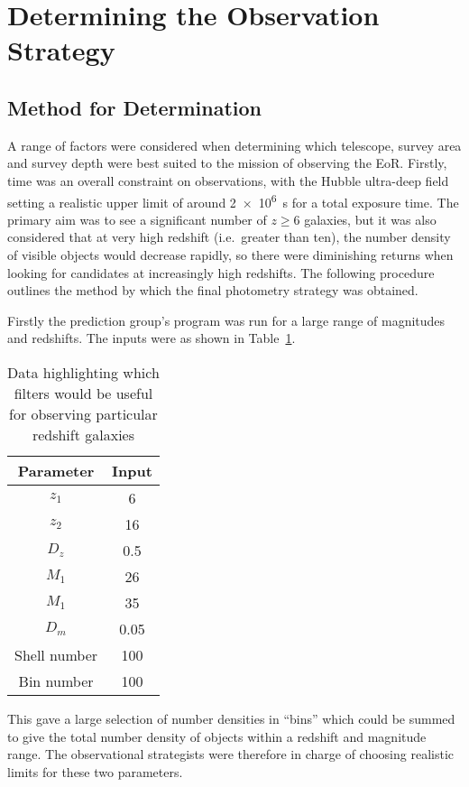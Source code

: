 
\section{Determining the Observation Strategy} %
\label{sec:method_for_strategy_choosing}
	\subsection{Method for Determination} %
	\label{sub:method_for_determination}
		A range of factors were considered when determining which telescope, survey area and survey depth were best suited to the mission of observing the EoR. Firstly, time was an overall constraint on observations, with the Hubble ultra-deep field setting a realistic upper limit of around \SI{2e6}{\second} for a total exposure time. The primary aim was to see a significant number of $z\ge6$ galaxies, but it was also considered that at very high redshift (i.e.\ greater than ten), the number density of visible objects would decrease rapidly, so there were diminishing returns when looking for candidates at increasingly high redshifts. The following procedure outlines the method by which the final photometry strategy was obtained.

		Firstly the prediction group’s program was run for a large range of magnitudes and redshifts. The inputs were as shown in Table~\ref{tab:program_inputs}.
		\begin{table}[!htbp]
			\begin{center}
				\begin{tabular}{c|c}
					Parameter 	& Input \\
					\hline \hline
					$z_1$ & 6 \\
					$z_2$ & 16 \\
					$D_z$ & 0.5 \\
					$M_1$ & 26 \\
					$M_1$ & 35 \\
					$D_m$ & 0.05 \\
					Shell number & 100 \\
					Bin number & 100
				\end{tabular}
			\end{center}
			\caption{Data highlighting which filters would be useful for observing particular redshift galaxies\cite{Galactic_Astronomy_Binney_Merrifield}\label{tab:program_inputs}}
		\end{table}

		This gave a large selection of number densities in ``bins'' which could be summed to give the total number density of objects within a redshift and magnitude range. The observational strategists were therefore in charge of choosing realistic limits for these two parameters.


